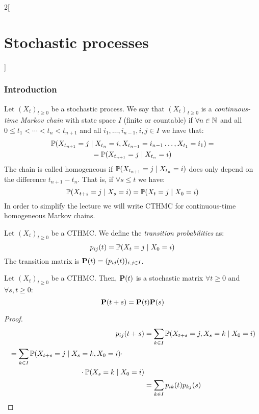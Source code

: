 \documentclass[../../../main_math.tex]{subfiles}
\begin{document}
\begin{multicols}{2}[\section{Stochastic processes}]
  \subsubsection{Introduction}
  \begin{definition}
    Let ${(X_t)}_{t\geq 0}$ be a stochastic process. We say that ${(X_t)}_{t\geq 0}$ is a \emph{continuous-time Markov chain} with state space $I$ (finite or countable) if $\forall n\in\mathbb{N}$ and all $0\leq t_1<\cdots<t_n<t_{n+1}$ and all $i_1,\ldots,i_{n-1},i,j\in I$ we have that:
    \begin{multline*}
      \mathbb{P}(X_{t_{n+1}}=j\mid X_{t_n}=i, X_{t_{n-1}}=i_{n-1}\ldots,X_{t_1}=i_1)=\\=\mathbb{P}(X_{t_{n+1}}=j\mid X_{t_n}=i)
    \end{multline*}
    The chain is called homogeneous if $\mathbb{P}(X_{t_{n+1}}=j\mid X_{t_n}=i)$ does only depend on the difference $t_{n+1}-t_n$. That is, if $\forall s\leq t$ we have:
    $$
      \mathbb{P}(X_{t+s}=j\mid X_{s}=i)=\mathbb{P}(X_{t}=j\mid X_0=i)
    $$
    In order to simplify the lecture we will write CTHMC for continuous-time homogeneous Markov chains.
  \end{definition}
  \begin{definition}
    Let ${(X_t)}_{t\geq 0}$ be a CTHMC. We define the \emph{transition probabilities} as:
    $$
      p_{ij}(t)=\mathbb{P}(X_t=j\mid X_0=i)
    $$
    The transition matrix is $\boldsymbol{\mathrm{P}}(t)=(p_{ij}(t))_{i,j\in I}$.
  \end{definition}
  \begin{proposition}\label{SP:ChapKolmo_continuous}
    Let ${(X_t)}_{t\geq 0}$ be a CTHMC. Then, $\boldsymbol{\mathrm{P}}(t)$ is a stochastic matrix $\forall t\geq 0$ and $\forall s,t \geq 0$: $$\boldsymbol{\mathrm{P}}(t+s)=\boldsymbol{\mathrm{P}}(t)\boldsymbol{\mathrm{P}}(s)$$
  \end{proposition}
  \begin{proof}
    \begin{align*}
      p_{ij}(t+s) & =\sum_{k\in I} \Prob(X_{t+s}=j,X_s=k\mid X_0=i) \\
      \begin{split}
        & =\sum_{k\in I} \Prob(X_{t+s}=j\mid X_s=k,X_0=i)\cdot\\
        &\hspace{3.5cm}\cdot\Prob(X_s=k\mid X_0=i) \\
      \end{split}         \\
                  & =\sum_{k\in I} p_{ik}(t)p_{kj}(s)
    \end{align*}

\end{proof}
\end{multicols}
\end{document}
